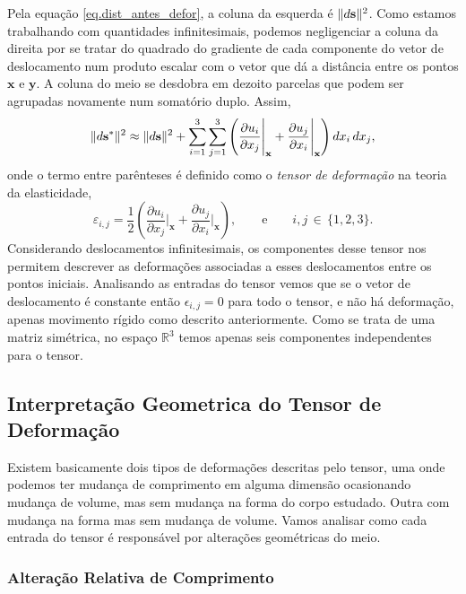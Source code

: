 Pela equa\c{c}\~ao \ref{eq.dist_antes_defor}, a coluna  da esquerda \'e $\lVert d\mathbf{s}\rVert^2$. Como estamos trabalhando com quantidades infinitesimais, podemos negligenciar a coluna da direita por se tratar do quadrado do gradiente de cada componente do vetor de deslocamento num produto escalar com o vetor que d\'a a dist\^ancia entre os pontos $\mathbf{x}$  e $\mathbf{y}$. A coluna do meio se desdobra em dezoito parcelas que podem ser agrupadas novamente num somat\'orio duplo. Assim,
\begin{equation*}
\lVert d\mathbf{s}^*\rVert^2\approx\lVert d\mathbf{s}\rVert^2+\sum_{i=1}^3\sum_{j=1}^3\left(\frac{\partial u_i}{\partial x_j}\Bigg\vert_{\mathbf{x}}+\frac{\partial u_j}{\partial x_i}\Bigg\vert_{\mathbf{x}}\right)dx_i\,dx_j,
\end{equation*}
onde o termo entre par\^enteses \'e definido como o \textit{tensor de deforma\c{c}\~ao} na teoria da elasticidade,
\begin{equation*}
\varepsilon_{i,j}=\frac{1}{2}\left(\frac{\partial u_i}{\partial x_j}\Bigg\vert_{\mathbf{x}}+\frac{\partial u_j}{\partial x_i}\Bigg\vert_{\mathbf{x}}\right),\qquad\text{e}\qquad i,j\,\in\,\{1,2,3\}.
\end{equation*}
Considerando deslocamentos infinitesimais, os componentes desse tensor nos permitem descrever as deforma\c{c}\~oes associadas a esses deslocamentos entre os pontos iniciais. Analisando as entradas do tensor vemos que se o vetor de deslocamento \'e constante ent\~ao $\epsilon_{i,j}=0$ para todo o tensor, e n\~ao h\'a deforma\c{c}\~ao, apenas movimento r\'igido como descrito anteriormente. Como se trata de uma matriz sim\'etrica, no espa\c{c}o $\mathbb{R}^3$ temos apenas seis componentes independentes para o tensor.

\subsection{Interpreta\c{c}\~ao Geometrica do Tensor de Deforma\c{c}\~ao}

Existem basicamente dois tipos de deforma\c{c}\~oes descritas pelo tensor, uma onde podemos ter mudan\c{c}a de comprimento em alguma dimens\~ao ocasionando mudan\c{c}a de volume, mas sem mudan\c{c}a na forma do corpo estudado. Outra com mudan\c{c}a na forma mas sem mudan\c{c}a de volume. Vamos analisar como cada entrada do tensor \'e respons\'avel por altera\c{c}\~oes geom\'etricas do meio.

\subsubsection{Altera\c{c}\~ao Relativa de Comprimento}

